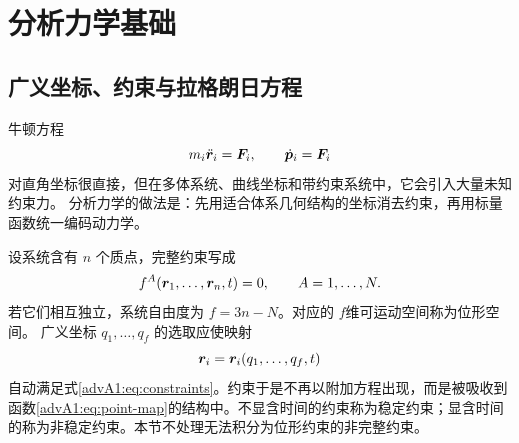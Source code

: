 \begingroup


\section{分析力学基础}

\subsection{广义坐标、约束与拉格朗日方程}

牛顿方程
\[
  m_i\ddot{\vect r}_i=\vect F_i,\qquad \dot{\vect p}_i=\vect F_i
\]
对直角坐标很直接，但在多体系统、曲线坐标和带约束系统中，它会引入大量未知约束力。
分析力学的做法是：先用适合体系几何结构的坐标消去约束，再用标量函数统一编码动力学。

设系统含有 $n$ 个质点，完整约束写成
\begin{equation}\label{advA1:eq:constraints}
 f^A(\vect r_1,\ldots,\vect r_n,t)=0,
 \qquad A=1,\ldots,N .
\end{equation}
若它们相互独立，系统自由度为 $f=3n-N$。对应的 $f$维可运动空间称为位形空间。
广义坐标 $q_1,\ldots,q_f$ 的选取应使映射
\begin{equation}\label{advA1:eq:point-map}
 \vect r_i=\vect r_i(q_1,\ldots,q_f,t)
\end{equation}
自动满足式\eqref{advA1:eq:constraints}。约束于是不再以附加方程出现，而是被吸收到函数\eqref{advA1:eq:point-map}的结构中。不显含时间的约束称为稳定约束；显含时间的称为非稳定约束。本节不处理无法积分为位形约束的非完整约束。

